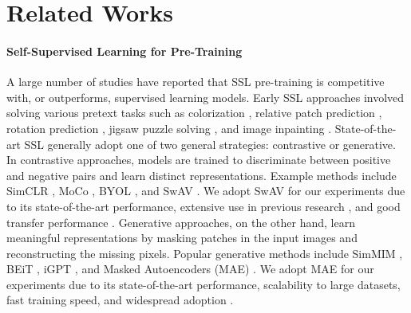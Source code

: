 \section{Related Works}
\label{sec:related-works}

\paragraph{Self-Supervised Learning for Pre-Training}
A large number of studies have reported that SSL pre-training is competitive with, or outperforms, supervised learning models\cite{caron2020unsupervised, misra2020self,chen2020simple,he2020momentum, he2022masked}.  Early SSL approaches involved solving various pretext tasks such as colorization \cite{zhang2016colorful}, relative patch prediction \cite{doersch2015unsupervised}, rotation prediction \cite{gidaris2018unsupervised}, jigsaw puzzle solving \cite{noroozi2016unsupervised}, and image inpainting \cite{pathak2016context}. State-of-the-art SSL generally adopt one of two general strategies: contrastive or generative.  In contrastive approaches, models are trained to discriminate between positive and negative pairs and learn distinct representations.  Example methods include SimCLR \cite{chen2020simple}, MoCo \cite{he2020momentum, chen2020mocov2}, BYOL \cite{grill2020bootstrap}, and SwAV \cite{caron2020unsupervised}.  We adopt SwAV for our experiments due to its state-of-the-art performance, extensive use in previous research \cite{isprs-archives-XLIII-B3-2022-1399-2022, hakizimana2024enhanced, calhoun2022self, guldenring2021self}, and good transfer performance \cite{ericsson2021well}. Generative approaches, on the other hand, learn meaningful representations by masking patches in the input images and reconstructing the missing pixels. Popular generative methods include SimMIM \cite{xie2022simmim}, BEiT \cite{bao2021beit}, iGPT \cite{chen2020generative}, and Masked Autoencoders (MAE) \cite{he2022masked}. We adopt MAE for our experiments due to its state-of-the-art performance, scalability to large datasets, fast training speed, and widespread adoption \cite{cong2022satmae, tang2024cross, reed2023scale, lin2023ss}.

